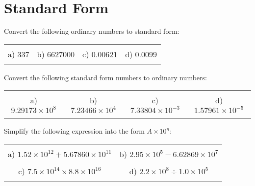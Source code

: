 \documentclass[12pt]{article}
\begin{document}
\section{Standard Form}
Convert the following ordinary numbers to standard form:
\begin{table}[h!]
\centering
\begin{tabular}{c c c c}
\hspace{2cm} & \hspace{5cm} & \hspace{5cm} & \hspace{4cm}\\
a) $337$ & b) $6627000$ & c) $0.00621$ & d) $0.0099$\\ \\
\end{tabular}
\end{table}
\newline
Convert the following standard form numbers to ordinary numbers:
\begin{table}[h!]
\centering
\begin{tabular}{c c c c}
\hspace{2cm} & \hspace{5cm} & \hspace{5cm} & \hspace{4cm}\\
a) $9.29173\times10^8$ & b) $7.23466\times10^4$ & c) $7.33804\times10^{-3}$ & d) $1.57961\times10^{-5}$\\ \\
\end{tabular}
\end{table}
\newline
Simplify the following expression into the form $A\times10^n$:
\begin{table}[h!]
\centering
\begin{tabular}{c c}
\hspace{5cm} & \hspace{5cm}\\
a) $1.52\times10^{12} + 5.67860\times10^{11}$ & b) $2.95\times10^{5} - 6.62869\times10^{7}$\\ \\
c) $7.5\times10^{14}\times8.8\times10^{16}$ & d) $2.2\times10^{8}\div1.0\times10^{5}$\\ \\
\end{tabular}
\end{table}
\newline
\newpage
\end{document}
